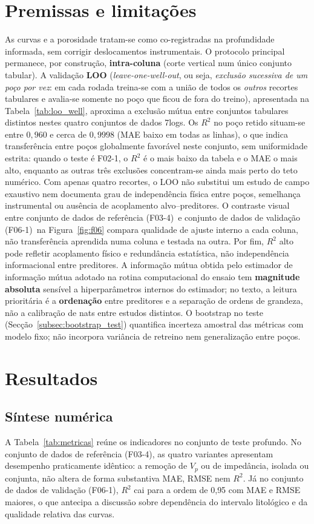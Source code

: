 \documentclass[12pt,a4paper]{article}
\newcommand{\dadosref}{conjunto de dados de referência (F03-4)}
\newcommand{\dadosval}{conjunto de dados de validação (F06-1)}
\begin{document}
\section{Premissas e limitações}\label{sec:premissas}

As curvas e a porosidade tratam-se como co-registradas na profundidade informada,
sem corrigir deslocamentos instrumentais. O protocolo principal permanece, por
construção, \textbf{intra-coluna} (corte vertical num único conjunto tabular). A validação
\textbf{LOO} (\textit{leave-one-well-out}, ou seja, \emph{exclusão sucessiva de um poço por vez}:
em cada rodada treina-se com a união de todos os \emph{outros} recortes tabulares e avalia-se
somente no poço que ficou de fora do treino), apresentada na Tabela~\ref{tab:loo_well}, aproxima a exclusão mútua
entre conjuntos tabulares distintos nestes quatro conjuntos de dados 7logs. Os \(R^2\) no poço retido
situam-se entre \(0{,}960\) e cerca de \(0{,}9998\) (MAE baixo em todas as linhas), o que indica
transferência entre poços globalmente favorável neste conjunto, sem uniformidade estrita:
quando o teste é F02-1, o \(R^2\) é o mais baixo da tabela e o MAE o mais alto, enquanto as outras
três exclusões concentram-se ainda mais perto do teto numérico. Com apenas quatro recortes,
o LOO não substitui um estudo de campo exaustivo nem documenta grau de independência física
entre poços, semelhança instrumental ou ausência de acoplamento alvo--preditores. O contraste visual entre \dadosref\ e \dadosval\ na Figura~\ref{fig:f06}
compara qualidade de ajuste interno a cada coluna, não transferência aprendida
numa coluna e testada na outra. Por fim, \(R^2\) alto pode refletir acoplamento físico e redundância
estatística, não independência informacional entre preditores. A informação
mútua obtida pelo estimador de informação mútua adotado na rotina computacional do
ensaio tem \textbf{magnitude absoluta} sensível a hiperparâmetros internos do
estimador; no texto, a leitura prioritária é a \textbf{ordenação} entre
preditores e a separação de ordens de grandeza, não a calibração de nats
entre estudos distintos. O bootstrap no teste (Secção~\ref{subsec:bootstrap_test})
quantifica incerteza amostral das métricas com modelo fixo; não incorpora variância
de retreino nem generalização entre poços.

\section{Resultados}\label{sec:resultados}

\subsection{Síntese numérica}\label{subsec:metricas}
A Tabela~\ref{tab:metricas} reúne os indicadores no conjunto de teste profundo.
No \dadosref, as quatro variantes apresentam desempenho praticamente
idêntico: a remoção de \(V_p\) ou de impedância, isolada ou conjunta, não
altera de forma substantiva MAE, RMSE nem \(R^2\). Já no \dadosval,
\(R^2\) cai para a ordem de 0{,}95 com MAE e RMSE maiores, o que antecipa a discussão
sobre dependência do intervalo litológico e da qualidade relativa das curvas.
\end{document}
